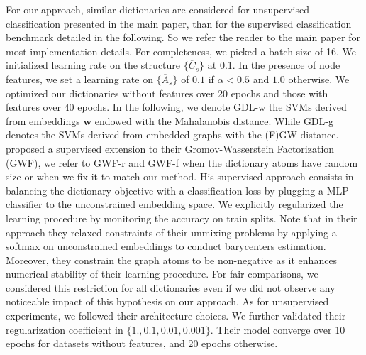 \documentclass{article}
\def\vw{{\bm{w}}}
\begin{document}
	For our approach, similar dictionaries are considered for unsupervised classification presented in the main paper, than for the supervised classification benchmark detailed in the following. So we refer the reader to the main paper for most implementation details. For completeness, we picked a batch size of 16. We initialized learning rate on the structure $\{\overline{C}_s\}$ at 0.1. In the presence of node features, we set a learning rate on $\{\overline{A}_s\}$ of $0.1$ if $\alpha<0.5$ and $1.0$ otherwise. We optimized our dictionaries without features over 20 epochs and those with features over 40 epochs. In the following,  we denote GDL-w the SVMs derived from embeddings $\vw$ endowed with the Mahalanobis distance. While GDL-g denotes the SVMs derived from embedded graphs with the (F)GW distance. \citep{xu_gromov-wasserstein_2019} proposed a supervised extension to their Gromov-Wasserstein Factorization (GWF), we refer to GWF-r and GWF-f when the dictionary atoms have random size or when we fix it to match our method. His supervised approach consists in balancing the dictionary objective with a classification loss by plugging a MLP classifier to the unconstrained embedding space. We explicitly regularized the learning procedure by monitoring the accuracy on train splits. Note that in their approach they relaxed constraints of their unmixing problems by applying a softmax on unconstrained embeddings to conduct barycenters estimation. Moreover, they constrain the graph atoms to be non-negative as it enhances numerical stability of their learning procedure. For fair comparisons, we considered this restriction for all dictionaries even if we did not observe any noticeable impact of this hypothesis on our approach. As for unsupervised experiments, we followed their architecture choices. We further validated their regularization coefficient in $\{1.,0.1,0.01,0.001\}$. Their model converge over 10 epochs for datasets without features, and 20 epochs otherwise.
	
\end{document}
